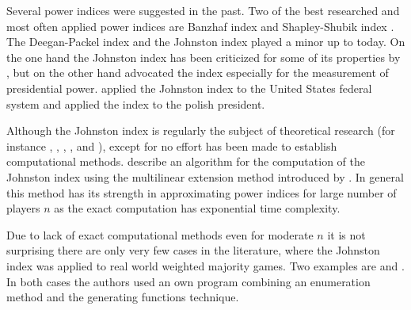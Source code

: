\documentclass[review]{elsarticle}
\theoremstyle{defn}
\theoremstyle{Pseudo-Code}
\begin{document}
Several power indices were suggested in the past. Two of the best researched and most often applied power indices are Banzhaf index \citep{Penrose1946, Banzhaf1965} and Shapley-Shubik index \citep{Shapley1954}.
The Deegan-Packel index \citep{Deegan1978} and the Johnston index \citep{Johnston1978} played a minor up to today. 
On the one hand the Johnston index has been criticized for some of its properties by \cite{FelsenthalMachover1998}, but on the other hand \cite{Brams1990} advocated the index especially for the measurement of presidential power.  \cite{Brams1990} applied the Johnston index to the United States federal system and \cite{Mercik2009} applied the index to the polish president.

Although the Johnston index is regularly the subject of theoretical research (for instance \cite{Hirokawa2006}, \cite{Alonso-Meijide2007}, \cite{Alonso-Meijide2008}, \cite{Freixas2012}, \cite{Freixas2013} and \cite{Kurz2016}), except for \cite{Alonso-Meijide2008} no effort has been made to establish computational methods.
\cite{Alonso-Meijide2008} describe an algorithm for the computation of the Johnston index using the multilinear extension method introduced by \cite{Owen1972}. In general this method has its strength in approximating power indices for large number of players $n$ as the exact computation has exponential time complexity.  %

Due to lack of exact computational methods even for moderate $n$ it is not surprising there are only very few cases in the literature, where the Johnston index was applied to real world weighted majority games. Two examples are \cite{Strand2003} and \cite{Strand2005}. In both cases the authors used an own program combining an enumeration method and the generating functions technique.
\end{document}

